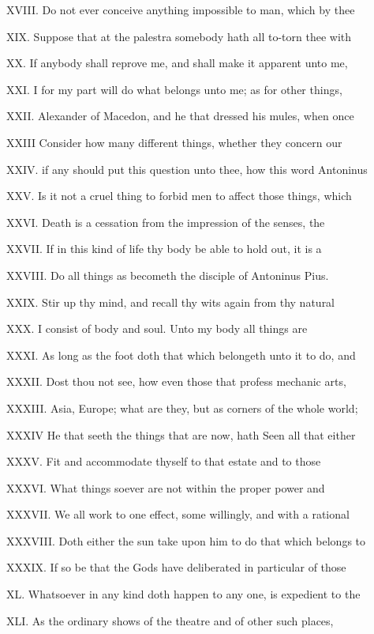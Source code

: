 XVIII. Do not ever conceive anything
impossible to man, which by thee

XIX. Suppose that at the palestra somebody
hath all to-torn thee with

XX. If anybody shall reprove me, and shall
make it apparent unto me,

XXI. I for my part will do what belongs unto
me; as for other things,

XXII. Alexander of Macedon, and he that
dressed his mules, when once

XXIII Consider how many different things,
whether they concern our

XXIV. if any should put this question unto
thee, how this word Antoninus

XXV. Is it not a cruel thing to forbid men to
affect those things, which

XXVI. Death is a cessation from the impression
of the senses, the

XXVII. If in this kind of life thy body be
able to hold out, it is a

XXVIII. Do all things as becometh the disciple
of Antoninus Pius.

XXIX. Stir up thy mind, and recall thy wits
again from thy natural

XXX. I consist of body and soul. Unto my body
all things are

XXXI. As long as the foot doth that which
belongeth unto it to do, and

XXXII. Dost thou not see, how even those that
profess mechanic arts,

XXXIII. Asia, Europe; what are they, but as
corners of the whole world;

XXXIV He that seeth the things that are now,
hath Seen all that either

XXXV. Fit and accommodate thyself to that
estate and to those

XXXVI. What things soever are not within the
proper power and

XXXVII. We all work to one effect, some
willingly, and with a rational

XXXVIII. Doth either the sun take upon him to
do that which belongs to

XXXIX. If so be that the Gods have deliberated
in particular of those

XL. Whatsoever in any kind doth happen to any
one, is expedient to the

XLI. As the ordinary shows of the theatre and
of other such places,

